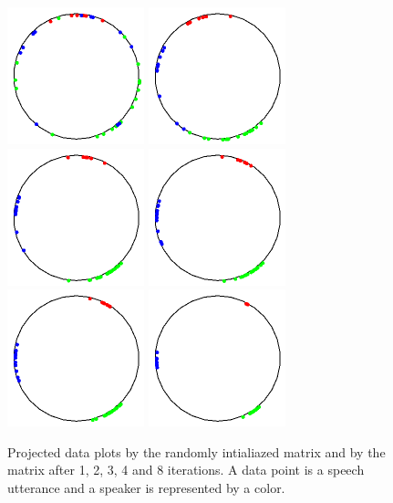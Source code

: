 \documentclass{techrep} %
\begin{document}
\begin{figure}[H]
  \centering
  \includegraphics[width=150px]{draw0}
  \includegraphics[width=150px]{draw1}
  \includegraphics[width=150px]{draw2}
  \includegraphics[width=150px]{draw3}
  \includegraphics[width=150px]{draw4}
  \includegraphics[width=150px]{draw8}
  \caption{Projected data plots by the randomly intialiazed matrix and
    by the matrix after 1, 2, 3, 4 and 8 iterations. A data point is a speech utterance and a speaker is
represented by a color.}
  \label{draws}
\end{figure}
\end{document}
